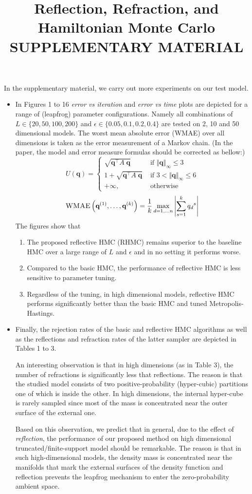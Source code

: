 \documentclass{article} %
\title{Reflection, Refraction, and Hamiltonian Monte Carlo\\\vspace{8pt}SUPPLEMENTARY MATERIAL}
\newcommand{\bvec}[1]{\textbf{#1}}
\newcommand{\case}[2]{#2 &\text{ if } #1}%
\newcommand{\otherwise}[1]{#1 &\text{ otherwise}}
\begin{document}
\maketitle

In the supplementary material, we carry out more experiments on our test model.
\begin{itemize}
\item In Figures 1 to 16 \emph{error vs iteration} and \emph{error vs time} plots are depicted for a range of (leapfrog) parameter configurations. Namely all combinations of $L \in \{20, 50, 100, 200\}$ and $\epsilon \in \{0.05, 0.1, 0.2, 0.4\}$ are tested on 2, 10 and 50 dimensional models. 
The worst mean absolute error (WMAE) over all dimensions is taken as the error measurement of a Markov chain. (In the paper, the model and error measure formulas should be corrected as bellow:)
\[
U(\bvec{q}) =
\begin{cases}
\case{\Vert \bvec{q} \Vert_\infty \leq 3}{\sqrt{\bvec{q}^\top A \; \bvec{q}}}\\
\case{3 < \Vert \bvec{q} \Vert_\infty \leq 6 }{1 + \sqrt{\bvec{q}^\top A \; \bvec{q}}}\\
\otherwise{+ \infty,}
\end{cases}
\] 
\[
\textsc{WMAE} \left( \bvec{q}^{(1)}, \ldots, \bvec{q}^{(k)} \right) = 
\frac{1}{k}
\max_{d=1, \ldots n} 
\left|\sum_{s=1}^k {q_d}^{s} \right|
\]
The figures show that 
\begin{enumerate}
\item 
The proposed reflective HMC (RHMC) remains superior to the baseline HMC over a large range of $L$ and $\epsilon$ and in no setting it performs worse.
\item Compared to the basic HMC, the performance of reflective HMC is less sensitive to parameter tuning.
\item Regardless of the tuning, in high dimensional models, reflective HMC performs significantly better than the basic HMC and tuned Metropolis-Hastings.
 \end{enumerate}
\item Finally, the rejection rates of the basic and reflective HMC algorithms as well as the reflections and refraction rates of the latter sampler are depicted in Tables 1 to 3. 

An interesting observation is that in high dimensions (as in Table 3), the number of refractions is significantly less that reflections. 
The reason is that the studied model consists of  two positive-probability (hyper-cubic) partitions one of which is inside the other. In high dimensions, the internal hyper-cube is rarely sampled since most of the mass is concentrated near the outer surface of the external one. 

Based on this observation, we predict that in general, due to the effect of \emph{reflection}, the performance of our proposed method on high dimensional truncated/finite-support model should be remarkable.
The reason is that in such high-dimensional models, the density mass is concentrated near the manifolds that mark the external surfaces of the density function and reflection prevents the leapfrog mechanism to enter the zero-probability ambient space. 
\end{itemize}
\end{document}
